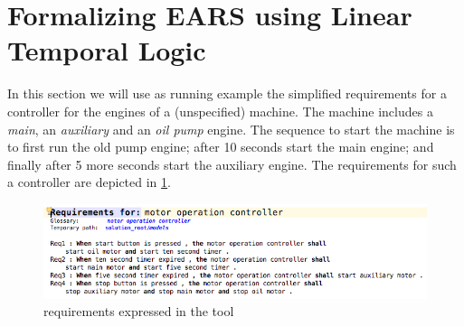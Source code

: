 \section{Formalizing EARS using Linear Temporal Logic}

In this section we will use as running example the simplified requirements for
a controller for the engines of a (unspecified) machine. The machine includes a
\emph{main}, an \emph{auxiliary} and an \emph{oil pump} engine. The sequence to
start the machine is to first run the old pump engine; after 10 seconds start
the main engine; and finally after 5 more seconds start the auxiliary engine.
The \ears requirements for such a controller are depicted in
\fig\ref{fig:reqs_motor}.

\begin{figure}[!h]
\centering
\includegraphics[width=.5\textwidth]{figures/motor_ears}
\caption{\ears requirements expressed in the \earsctrl tool}
\label{fig:reqs_motor}
\end{figure}

